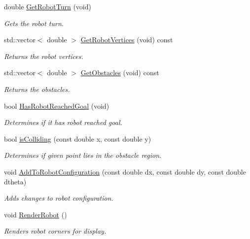 \begin{DoxyCompactItemize}
double \hyperlink{classRobotSimulator_a3ca3ad525b38e5f0b2ee556916058775}{Get\-Robot\-Turn} (void)
\begin{DoxyCompactList}\small\item\em Gets the robot turn. \end{DoxyCompactList}\item 
std\-::vector$<$ double $>$ \hyperlink{classRobotSimulator_a46889428dbad6da706f451df859c5473}{Get\-Robot\-Vertices} (void) const 
\begin{DoxyCompactList}\small\item\em Returns the robot vertices. \end{DoxyCompactList}\item 
std\-::vector$<$ double $>$ \hyperlink{classRobotSimulator_a28cb2c0a5c2b2f003def7fdcfa8971cf}{Get\-Obstacles} (void) const 
\begin{DoxyCompactList}\small\item\em Returns the obstacles. \end{DoxyCompactList}\item 
bool \hyperlink{classRobotSimulator_a2a4c5f6ce1c2388f02f9006811e6b6e0}{Has\-Robot\-Reached\-Goal} (void)
\begin{DoxyCompactList}\small\item\em Determines if it has robot reached goal. \end{DoxyCompactList}\item 
bool \hyperlink{classRobotSimulator_a564d79ead199c034841eda1b3ebebfcd}{is\-Colliding} (const double x, const double y)
\begin{DoxyCompactList}\small\item\em Determines if given point lies in the obstacle region. \end{DoxyCompactList}\item 
void \hyperlink{classRobotSimulator_a33390e3aa4106ca2e2ee8dd414bdcaea}{Add\-To\-Robot\-Configuration} (const double dx, const double dy, const double dtheta)
\begin{DoxyCompactList}\small\item\em Adds changes to robot configuration. \end{DoxyCompactList}\item 
void \hyperlink{classRobotSimulator_a121de184441f83f4493ba77e78b0b78f}{Render\-Robot} ()
\begin{DoxyCompactList}\small\item\em Renders robot corners for display. \end{DoxyCompactList}\end{DoxyCompactItemize}
